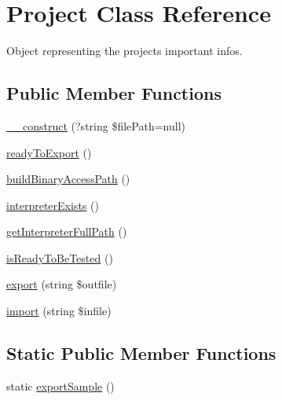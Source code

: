 \hypertarget{classProject}{}\section{Project Class Reference}
\label{classProject}


Object representing the project\textquotesingle{}s important infos.  


\subsection*{Public Member Functions}
\begin{DoxyCompactItemize}
\item 
\hyperlink{classProject_a8cdc8d54b71a7084cd0ed8f30fbec1bc}{\+\_\+\+\_\+construct} (?string \$file\+Path=null)
\item 
\hyperlink{classProject_ae494148807f65c817af1e3b0139fee5f}{ready\+To\+Export} ()
\item 
\hyperlink{classProject_aba3771ee0f7928f720510eea8a6b3337}{build\+Binary\+Access\+Path} ()
\item 
\hyperlink{classProject_a96804c40f63ec38018f480c73a7c20a8}{interpreter\+Exists} ()
\item 
\hyperlink{classProject_ab08a24e761958ef13b631cb5155286ad}{get\+Interpreter\+Full\+Path} ()
\item 
\hyperlink{classProject_a290cf05d80192d6ea99c119e91631197}{is\+Ready\+To\+Be\+Tested} ()
\item 
\hyperlink{classProject_af50a24af7524ef28c4d7b39f53153498}{export} (string \$outfile)
\item 
\hyperlink{classProject_a726e3f6542b4b4a15c8c73f92fa84b5a}{import} (string \$infile)
\end{DoxyCompactItemize}
\subsection*{Static Public Member Functions}
\begin{DoxyCompactItemize}
\item 
static \hyperlink{classProject_a5c9ad606315d82f9d09c5fef29b930e2}{export\+Sample} ()
\end{DoxyCompactItemize}

